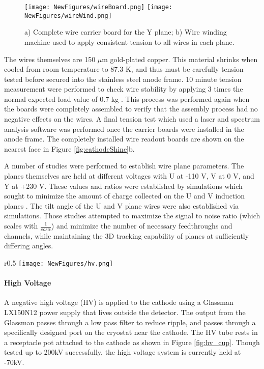 \documentclass[12pt]{article}
\begin{document}
\begin{figure}[h!]
\centering
\texttt{[image: NewFigures/wireBoard.png]}
\hspace{3 mm} 
\texttt{[image: NewFigures/wireWind.png]}
\caption{ a) Complete wire carrier board for the Y plane; b) Wire winding machine used to apply consistent tension to all wires in each plane. }
\label{fig:wire_stuff}
\end{figure}

\par The wires themselves are 150 $\mu$m gold-plated copper.  This material shrinks when cooled from room temperature to 87.3 K, and thus must be carefully tension tested before secured into the stainless steel anode frame. 10 minute tension measurement were performed to check wire stability by applying 3 times the normal expected load value of 0.7 kg \cite{bib:uboone_JINST}.  This process was performed again when the boards were completely assembled to verify that the assembly process had no negative effects on the wires. A final tension test which used a laser and spectrum analysis software was performed once the carrier boards were installed in the anode frame. The completely installed wire readout boards are shown on the nearest face in Figure \ref{fig:cathodeShine}b.

\par A number of studies were performed to establish wire plane parameters. The planes themselves are held at different voltages with U at -110 V, V at 0 V, and Y at +230 V.  These values and ratios were established by simulations which sought to minimize the amount of charge collected on the U and V induction planes \cite{bib:uboone_proposal} \cite{bib:tdr}.  The tilt angle of the U and V plane wires were also established via simulations.  Those studies attempted to maximize the signal to noise ratio (which scales with $\frac{1}{cos\alpha}$) and minimize the number of necessary feedthroughs and channels, while maintaining the 3D tracking capability of planes at sufficiently differing angles.

\begin{wrapfigure}{r}{0.5\textwidth}
\centering
\texttt{[image: NewFigures/hv.png]}
\caption{ MicroBooNE HV feedthrough resting in the receptacle cup attached to the cathode. } 
\label{fig:hv_cup}
\end{wrapfigure}

\paragraph{High Voltage}
\par A negative high voltage (HV) is applied to the cathode using a Glassman LX150N12 power supply that lives outside the detector.  The output from the Glassman passes through a low pass filter to reduce ripple, and passes through a specifically designed port on the cryostat near the cathode.  The HV tube rests in a receptacle pot attached to the cathode as shown in Figure \ref{fig:hv_cup}.
\noindent Though tested up to 200kV successfully, the high voltage system is currently held at -70kV.
\end{document}
